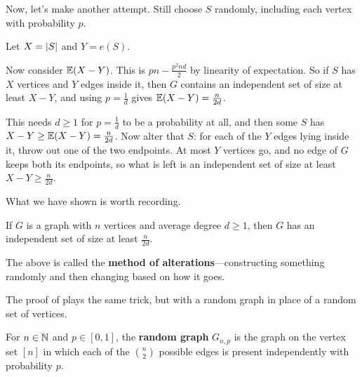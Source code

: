 Now, let's make another attempt. Still choose $S$ randomly, including each vertex with probability $p$.

Let $X = \left\lvert S \right\rvert$ and $Y = e(S)$.

Now consider $\mathbb{E}\!\left( X - Y \right)$. This is $pn - \frac{p^2 n d}{2}$ by linearity of expectation. So if $S$ has $X$ vertices and $Y$ edges inside it, then $G$ contains an independent set of size at least $X - Y$, and using $p = \frac{1}{d}$ gives $\mathbb{E}\!\left( X - Y \right) = \frac{n}{2d}$.

This needs $d \geq 1$ for $p = \frac{1}{d}$ to be a probability at all, and then some $S$ has $X - Y \geq \mathbb{E}\!\left( X - Y \right) = \frac{n}{2d}$. Now alter that $S$: for each of the $Y$ edges lying inside it, throw out one of the two endpoints. At most $Y$ vertices go, and no edge of $G$ keeps both its endpoints, so what is left is an independent set of size at least $X - Y \geq \frac{n}{2d}$.

What we have shown is worth recording.

\begin{boxlemma}
    If $G$ is a graph with $n$ vertices and average degree $d \geq 1$, then $G$ has an independent set of size at least $\frac{n}{2d}$.
\end{boxlemma}

The above is called the \textbf{method of alterations}---constructing something randomly and then changing based on how it goes.

The proof of  plays the same trick, but with a random graph in place of a random set of vertices.

\begin{boxdefinition} \label{Ch2:Def:Random_Graph}
    For $n \in \mathbb{N}$ and $p \in [0, 1]$, the \textbf{random graph} $G_{n, p}$ is the graph on the vertex set $[n]$ in which each of the $\binom{n}{2}$ possible edges is present independently with probability $p$.
\end{boxdefinition}

